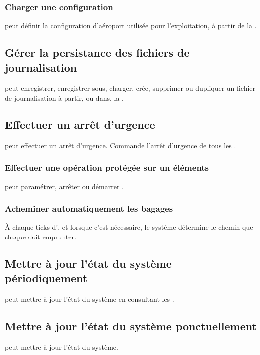 \subsubsection{Charger une configuration}
 peut définir la configuration d'aéroport utilisée pour l'exploitation, à partir de la .

\subsection{Gérer la persistance des fichiers de journalisation}
 peut enregistrer, enregistrer sous, charger, crée, supprimer ou dupliquer un fichier de journalisation à partir, ou dans, la .

\subsection{Effectuer un arrêt d'urgence}
 peut effectuer un arrêt d'urgence. Commande l'arrêt d'urgence de tous les .

\subsubsection{Effectuer une opération protégée sur un éléments}
 peut paramétrer, arrêter ou démarrer .

\subsubsection{Acheminer automatiquement les bagages}
À chaque ticks d', et lorsque c'est nécessaire, le système détermine le chemin que chaque  doit emprunter.

\subsection{Mettre à jour l'état du système périodiquement}
 peut mettre à jour l'état du système en consultant les .

\subsection{Mettre à jour l'état du système ponctuellement}
 peut mettre à jour l'état du système.

